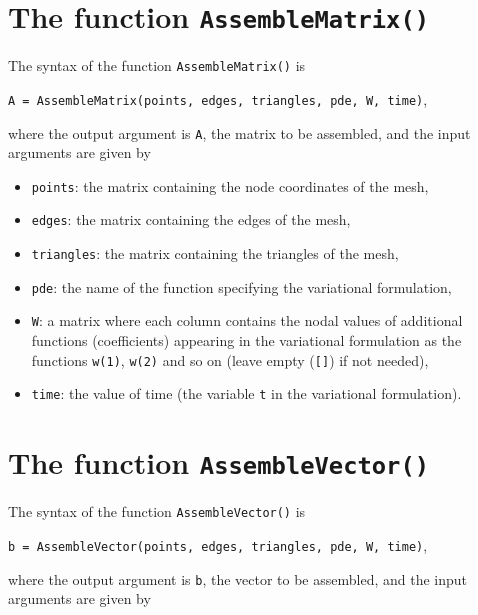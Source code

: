 \documentclass[12pt]{article}
\begin{document}
\cleardoublepage
\section{The function \texttt{AssembleMatrix()}}

The syntax of the function \texttt{AssembleMatrix()} is

\quad \texttt{A = AssembleMatrix(points, edges, triangles, pde, W, time)},

where the output argument is \texttt{A}, the matrix to be assembled, and
the input arguments are given by

\begin{itemize}
\item \texttt{points}:    the matrix containing the node coordinates of the mesh,
\item \texttt{edges}:     the matrix containing the edges of the mesh,
\item \texttt{triangles}: the matrix containing the triangles of the mesh,
\item \texttt{pde}:       the name of the function specifying the variational formulation,
\item \texttt{W}:         a matrix where each column contains the nodal values of additional functions (coefficients) appearing in the
                          variational formulation as the functions \texttt{w(1)}, \texttt{w(2)} and so on (leave empty (\texttt{[]}) if not needed),
\item \texttt{time}:      the value of time (the variable \texttt{t} in the variational formulation).
\end{itemize}

\cleardoublepage
\section{The function \texttt{AssembleVector()}}

The syntax of the function \texttt{AssembleVector()} is

\quad \texttt{b = AssembleVector(points, edges, triangles, pde, W, time)},

where the output argument is \texttt{b}, the vector to be assembled, and
the input arguments are given by
\end{document}
